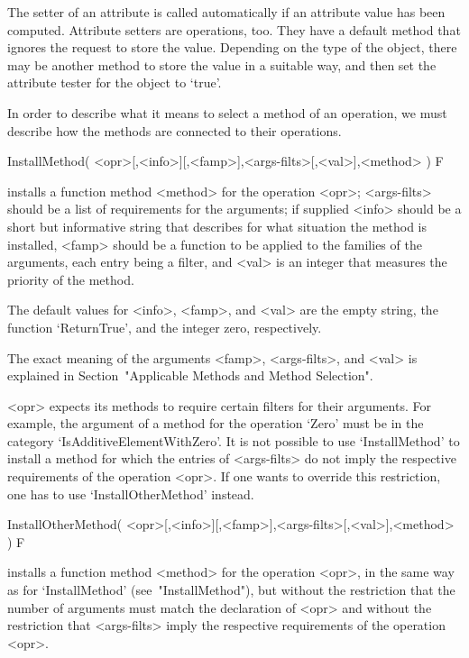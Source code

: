 The setter of an attribute is called automatically
if an attribute value has been computed.
Attribute setters are operations, too.
They have a default method that ignores the request to store the value.
Depending on the type of the object,
there may be another method to store the value in a suitable way,
and then set the attribute tester for the object to `true'.



In order to describe what it means to select a method of an operation,
we must describe how the methods are connected to their operations.

\>InstallMethod( <opr>[,<info>][,<famp>],<args-filts>[,<val>],<method> ) F

installs a function method <method> for the operation <opr>; 
<args-filts> should be a list of requirements for the arguments;
if supplied <info> should be a short but informative string that describes 
for what situation the method is installed,
<famp> should be a function to be applied to the families of the arguments,
each entry being a filter,
and <val> is an integer that measures the priority of the method.

The default values for <info>, <famp>, and <val> are the empty string,
the function `ReturnTrue', and the integer zero, respectively.

The exact meaning of the arguments <famp>, <args-filts>,
and <val> is explained in Section~"Applicable Methods and Method Selection".

<opr> expects its methods to require certain filters for their arguments.
For example, the argument of a method for the operation `Zero' must be
in the category `IsAdditiveElementWithZero'.
It is not possible to use `InstallMethod' to install a method for which
the entries of <args-filts> do not imply the respective requirements of
the operation <opr>.
If one wants to override this restriction,
one has to use `InstallOtherMethod' instead.

\>InstallOtherMethod( <opr>[,<info>][,<famp>],<args-filts>[,<val>],<method> ) F

installs a function method <method> for the operation <opr>, in the same
way as for `InstallMethod' (see~"InstallMethod"), but without the restriction
that the number of arguments must match the declaration of <opr> and without
the restriction that <args-filts> imply the respective requirements of
the operation <opr>.

